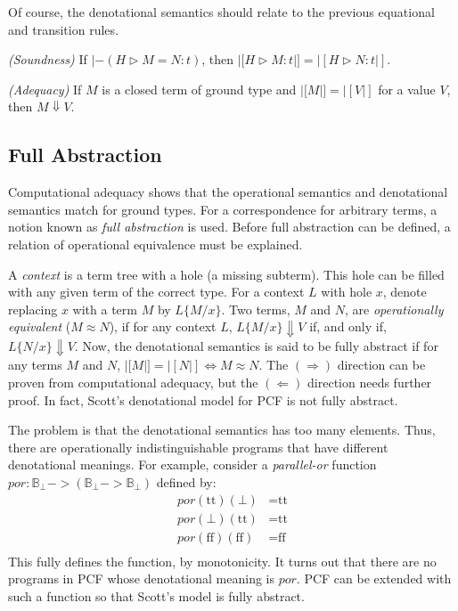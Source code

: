 Of course, the denotational semantics should relate to the previous equational and transition rules.

\begin{theorem}
\emph{(Soundness)} If $|- (H \triangleright M = N : t)$, then $|[H \triangleright M : t|] = |[H \triangleright N : t|]$.
\end{theorem}

\begin{theorem}
\emph{(Adequacy)} If $M$ is a closed term of ground type and $|[M|] = |[V|]$ for a value $V$, then $M\Downarrow V$.
\end{theorem}

\subsection{Full Abstraction}

Computational adequacy shows that the operational semantics and denotational semantics match for ground types.  For a correspondence for arbitrary terms, a notion known as \emph{full abstraction} is used. Before full abstraction can be defined, a relation of operational equivalence must be explained.

A \emph{context} is a term tree with a hole (a missing subterm). This hole can be filled with any given term of the correct type.  For a context $L$ with hole $x$, denote replacing $x$ with a term $M$ by $L\{M/x\}$.  Two terms, $M$ and $N$, are \emph{operationally equivalent} ($M \approx N$), if for any context $L$, $L\{M/x\} \Downarrow V$ if, and only if, $L\{N/x\} \Downarrow V$.  Now, the denotational semantics is said to be fully abstract if for any terms $M$ and $N$, $|[M|] = |[N|] \Leftrightarrow M \approx N$.  The $(\Rightarrow)$ direction can be proven from computational adequacy, but the $(\Leftarrow)$ direction needs further proof.  In fact, Scott's denotational model for PCF is not fully abstract.

The problem is that the denotational semantics has too many elements.  Thus, there are operationally indistinguishable programs that have different denotational meanings.  For example, consider a \emph{parallel-or} function $por:\mathbb{B}_{\bot}->(\mathbb{B}_{\bot}->\mathbb{B}_{\bot})$ defined by: \vspace{-5 mm}
\begin{align*}
por(\text{tt})(\bot) &= \text{tt} \\
por(\bot)(\text{tt}) &= \text{tt} \\
por(\text{ff})(\text{ff}) &= \text{ff} \\[-13 mm]
\end{align*}
This fully defines the function, by monotonicity.  It turns out that there are no programs in PCF whose denotational meaning is $por$.  PCF can be extended with such a function so that Scott's model is fully abstract.

